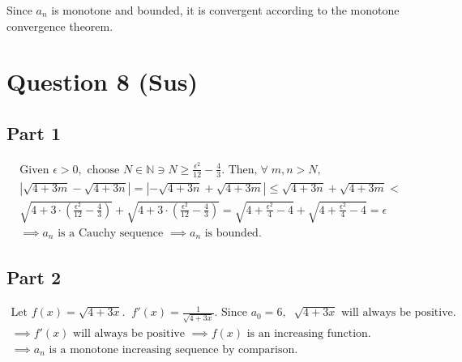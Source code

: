 \documentclass[12pt, a4paper]{article}
\newcommand{\nat}{\mathbb{N}}
\newcommand{\all}{\; \forall \;}
\newcommand{\rom}{\sqrt{4+3m}}
\newcommand{\ron}{\sqrt{4+3n}}
\begin{document}
Since $a_n$ is monotone and bounded, it is convergent according to the
monotone convergence theorem.

\section{Question 8 (Sus)}

\subsection{Part 1}
\begin{gather*}
  \text{Given } \epsilon > 0, \text{ choose }
  N \in \nat \ni N \geq \frac{\epsilon^2}{12} - \frac{4}{3}. \text{ Then,}
  \all m, n > N,\\[5pt] 
  | \rom - \ron | = | -\ron + \rom | \leq \ron + \rom < \\[5pt]
  \sqrt{4 + 3 \cdot (\frac{\epsilon^2}{12} - \frac{4}{3})} 
  + \sqrt{4 + 3 \cdot (\frac{\epsilon^2}{12} - \frac{4}{3})} =
  \sqrt{4 + \frac{\epsilon^2}{4} - 4} + \sqrt{4 + \frac{\epsilon^2}{4} - 4} = \epsilon \\[5pt]
  \implies a_n \text{ is a Cauchy sequence } \implies a_n \text{ is bounded.}
\end{gather*}

\subsection{Part 2}
\begin{gather*}
  \text{Let } f(x) = \sqrt{4 + 3x}. \; \; f'(x) = \frac{1}{\sqrt{4 + 3x}}.
  \text{ Since } a_0 = 6, \;\; \sqrt{4 + 3x} \text{ will always be positive.} \\[5pt]
  \implies f'(x) \text{ will always be positive } \implies f(x) \text{ is an increasing function. } \\[5pt]
  \implies a_n \text{ is a monotone increasing sequence by comparison.}
\end{gather*}
\end{document}
